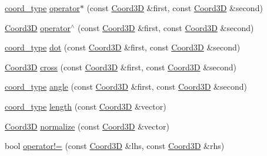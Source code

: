 \begin{DoxyCompactItemize}
\item 
\hyperlink{namespaceMcCAD_1_1Geometry_ac043b37a4a7e849fca22869e1982d2f8}{coord\+\_\+type} \hyperlink{namespaceMcCAD_1_1Geometry_a061152d1567c0497110e721833719457}{operator$\ast$} (const \hyperlink{classMcCAD_1_1Geometry_1_1Coord3D}{Coord3D} \&first, const \hyperlink{classMcCAD_1_1Geometry_1_1Coord3D}{Coord3D} \&second)
\item 
\hyperlink{classMcCAD_1_1Geometry_1_1Coord3D}{Coord3D} \hyperlink{namespaceMcCAD_1_1Geometry_a36c23062f69cd17452c4f278569ea5ee}{operator$^\wedge$} (const \hyperlink{classMcCAD_1_1Geometry_1_1Coord3D}{Coord3D} \&first, const \hyperlink{classMcCAD_1_1Geometry_1_1Coord3D}{Coord3D} \&second)
\item 
\hyperlink{namespaceMcCAD_1_1Geometry_ac043b37a4a7e849fca22869e1982d2f8}{coord\+\_\+type} \hyperlink{namespaceMcCAD_1_1Geometry_aaea589ff80c14f357e88a55f5c0da561}{dot} (const \hyperlink{classMcCAD_1_1Geometry_1_1Coord3D}{Coord3D} \&first, const \hyperlink{classMcCAD_1_1Geometry_1_1Coord3D}{Coord3D} \&second)
\item 
\hyperlink{classMcCAD_1_1Geometry_1_1Coord3D}{Coord3D} \hyperlink{namespaceMcCAD_1_1Geometry_a56c190a48b294fd9ff6479afa739ddbd}{cross} (const \hyperlink{classMcCAD_1_1Geometry_1_1Coord3D}{Coord3D} \&first, const \hyperlink{classMcCAD_1_1Geometry_1_1Coord3D}{Coord3D} \&second)
\item 
\hyperlink{namespaceMcCAD_1_1Geometry_ac043b37a4a7e849fca22869e1982d2f8}{coord\+\_\+type} \hyperlink{namespaceMcCAD_1_1Geometry_a7b2e709dc661de3cbf3508f10ddcc6db}{angle} (const \hyperlink{classMcCAD_1_1Geometry_1_1Coord3D}{Coord3D} \&first, const \hyperlink{classMcCAD_1_1Geometry_1_1Coord3D}{Coord3D} \&second)
\item 
\hyperlink{namespaceMcCAD_1_1Geometry_ac043b37a4a7e849fca22869e1982d2f8}{coord\+\_\+type} \hyperlink{namespaceMcCAD_1_1Geometry_ac903d712197cbd7f2738fef2e3beb258}{length} (const \hyperlink{classMcCAD_1_1Geometry_1_1Coord3D}{Coord3D} \&vector)
\item 
\hyperlink{classMcCAD_1_1Geometry_1_1Coord3D}{Coord3D} \hyperlink{namespaceMcCAD_1_1Geometry_a3720c38ff5b715f74b93cbd776862e44}{normalize} (const \hyperlink{classMcCAD_1_1Geometry_1_1Coord3D}{Coord3D} \&vector)
\item 
bool \hyperlink{namespaceMcCAD_1_1Geometry_aebdcb1d5a18768d067b7b2f7271c167d}{operator!=} (const \hyperlink{classMcCAD_1_1Geometry_1_1Coord3D}{Coord3D} \&lhs, const \hyperlink{classMcCAD_1_1Geometry_1_1Coord3D}{Coord3D} \&rhs)
\item 

\end{DoxyCompactItemize}
